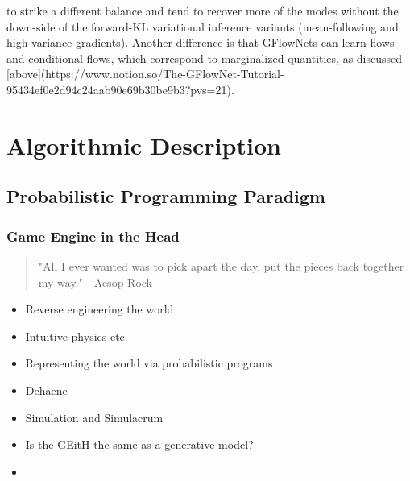 to strike a different balance and tend to recover more of the modes without the down-side of the forward-KL variational inference variants (mean-following and high variance gradients). Another difference is that GFlowNets can learn flows and conditional flows, which correspond to marginalized quantities, as discussed [above](https://www.notion.so/The-GFlowNet-Tutorial-95434ef0e2d94c24aab90e69b30be9b3?pvs=21).









\chapter{Algorithmic Description}
\section{Probabilistic Programming Paradigm}

\subsection{Game Engine in the Head}

\begin{quote}
    "All I ever wanted was to pick apart the day, put the pieces back together my way." - Aesop Rock
\end{quote}

\begin{itemize}
    \item Reverse engineering the world
    \item Intuitive physics etc. 
    \item Representing the world via probabilistic programs
    \item Dehaene
    \item Simulation and Simulacrum
    \item Is the GEitH the same as a generative model?
    \item 
\end{itemize}

